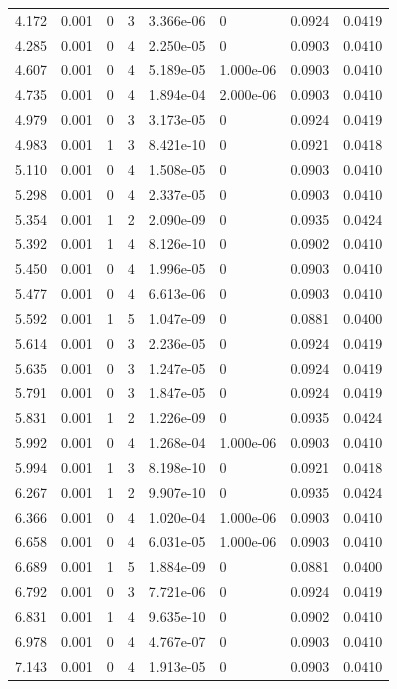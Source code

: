 \documentclass[preview]{standalone}
\begin{document}
{{\begin{tabular}{L{1.2cm}C{1.2cm} C{0.3cm}C{0.5cm} C{1.4cm}C{1.4cm} C{1.4cm}C{1.4cm}}
  4.172  &  0.001  & 0     &  3 &  3.366e-06  & 0  & 0.0924 &  0.0419   \\ 
  4.285  &  0.001  & 0     &  4 &  2.250e-05  & 0  & 0.0903 &  0.0410   \\ 
  4.607  &  0.001  & 0     &  4 &  5.189e-05  & 1.000e-06  & 0.0903 &  0.0410   \\ 
  4.735  &  0.001  & 0     &  4 &  1.894e-04  & 2.000e-06  & 0.0903 &  0.0410   \\ 
  4.979  &  0.001  & 0     &  3 &  3.173e-05  & 0  & 0.0924 &  0.0419   \\ 
  4.983  &  0.001  & 1     &  3 &  8.421e-10  & 0  & 0.0921 &  0.0418   \\ 
  5.110  &  0.001  & 0     &  4 &  1.508e-05  & 0  & 0.0903 &  0.0410   \\ 
  5.298  &  0.001  & 0     &  4 &  2.337e-05  & 0  & 0.0903 &  0.0410   \\ 
  5.354  &  0.001  & 1     &  2 &  2.090e-09  & 0  & 0.0935 &  0.0424   \\ 
  5.392  &  0.001  & 1     &  4 &  8.126e-10  & 0  & 0.0902 &  0.0410   \\ 
  5.450  &  0.001  & 0     &  4 &  1.996e-05  & 0  & 0.0903 &  0.0410   \\ 
  5.477  &  0.001  & 0     &  4 &  6.613e-06  & 0  & 0.0903 &  0.0410   \\ 
  5.592  &  0.001  & 1     &  5 &  1.047e-09  & 0  & 0.0881 &  0.0400   \\ 
  5.614  &  0.001  & 0     &  3 &  2.236e-05  & 0  & 0.0924 &  0.0419   \\ 
  5.635  &  0.001  & 0     &  3 &  1.247e-05  & 0  & 0.0924 &  0.0419   \\ 
  5.791  &  0.001  & 0     &  3 &  1.847e-05  & 0  & 0.0924 &  0.0419   \\ 
  5.831  &  0.001  & 1     &  2 &  1.226e-09  & 0  & 0.0935 &  0.0424   \\ 
  5.992  &  0.001  & 0     &  4 &  1.268e-04  & 1.000e-06  & 0.0903 &  0.0410   \\ 
  5.994  &  0.001  & 1     &  3 &  8.198e-10  & 0  & 0.0921 &  0.0418   \\ 
  6.267  &  0.001  & 1     &  2 &  9.907e-10  & 0  & 0.0935 &  0.0424   \\ 
  6.366  &  0.001  & 0     &  4 &  1.020e-04  & 1.000e-06  & 0.0903 &  0.0410   \\ 
  6.658  &  0.001  & 0     &  4 &  6.031e-05  & 1.000e-06  & 0.0903 &  0.0410   \\ 
  6.689  &  0.001  & 1     &  5 &  1.884e-09  & 0  & 0.0881 &  0.0400   \\ 
  6.792  &  0.001  & 0     &  3 &  7.721e-06  & 0  & 0.0924 &  0.0419   \\ 
  6.831  &  0.001  & 1     &  4 &  9.635e-10  & 0  & 0.0902 &  0.0410   \\ 
  6.978  &  0.001  & 0     &  4 &  4.767e-07  & 0  & 0.0903 &  0.0410   \\ 
  7.143  &  0.001  & 0     &  4 &  1.913e-05  & 0  & 0.0903 &  0.0410   \\ 
\hline 
\end{tabular} 

}}
\end{document}
